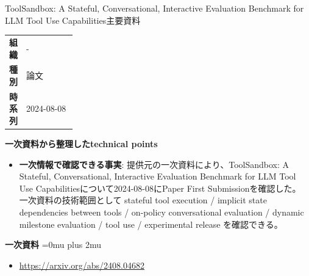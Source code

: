 \begin{technicalnote}{ToolSandbox: A Stateful, Conversational, Interactive Evaluation Benchmark for LLM Tool Use Capabilities}{主要資料}
\begingroup
\begin{tabularx}{\linewidth}{@{}>{\bfseries}p{0.22\linewidth}X@{}}
組織 & - \\
種別 & 論文 \\
時系列 & 2024-08-08 \\
\end{tabularx}
\smallskip
{\bfseries 一次資料から整理したtechnical points}
\begin{itemize}[leftmargin=1.5em,itemsep=0.35em]
\item \textbf{一次情報で確認できる事実}: 提供元の一次資料により、ToolSandbox: A Stateful, Conversational, Interactive Evaluation Benchmark for LLM Tool Use Capabilitiesについて2024-08-08にPaper First Submissionを確認した。 一次資料の技術範囲として stateful tool execution / implicit state dependencies between tools / on-policy conversational evaluation / dynamic milestone evaluation / tool use / experimental release を確認できる。
\end{itemize}
\begin{minipage}{\linewidth}
\begin{samepage}
{\bfseries 一次資料}
\begingroup\sloppy
\Urlmuskip=0mu plus 2mu\relax
\begin{itemize}[leftmargin=1.5em,itemsep=0.25em]
\item {\scriptsize\url{https://arxiv.org/abs/2408.04682}}
\end{itemize}
\endgroup
\end{samepage}
\end{minipage}
\endgroup
\end{technicalnote}
\medskip

